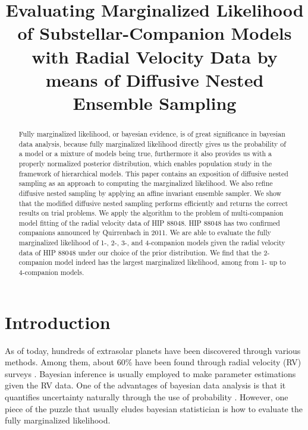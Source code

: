 \documentclass[letterpaper, preprint]{aastex}
\begin{document}
\title{
  Evaluating Marginalized Likelihood of Substellar-Companion Models with Radial Velocity Data by means of Diffusive Nested Ensemble Sampling
}

\begin{abstract}
Fully marginalized likelihood, or bayesian evidence, is of great significance in bayesian data analysis, because fully marginalized likelihood directly gives us the probability of a model or a mixture of models being true, furthermore it also provides us with a properly normalized posterior distribution, which enables population study in the framework of hierarchical models. This paper contains an exposition of diffusive nested sampling as an approach to computing the marginalized likelihood. We also refine diffusive nested sampling by applying an affine invariant ensemble sampler. We show that the modified diffusive nested sampling performs efficiently and returns the correct results on trial problems. We apply the algorithm to the problem of multi-companion model fitting of the radial velocity data of HIP 88048. HIP 88048 has two confirmed companions announced by Quirrenbach in 2011. We are able to evaluate the fully marginalized likelihood of 1-, 2-, 3-, and 4-companion models given the radial velocity data of HIP 88048 under our choice of the prior distribution. We find that the 2-companion model indeed has the largest marginalized likelihood, among from 1- up to 4-companion models. 

\end{abstract}


\section{Introduction}

As of today, hundreds of extrasolar planets have been discovered through various methods. Among them, about 60\% have been found through radial velocity (RV) surveys \citep{mitchell13a}. Bayesian inference is usually employed to make parameter estimations given the RV data. One of the advantages of bayesian data analysis is that it quantifies uncertainty naturally through the use of probability \citep{gelman04a}. However, one piece of the puzzle that usually eludes bayesian statistician is how to evaluate the fully marginalized likelihood.
\end{document}
